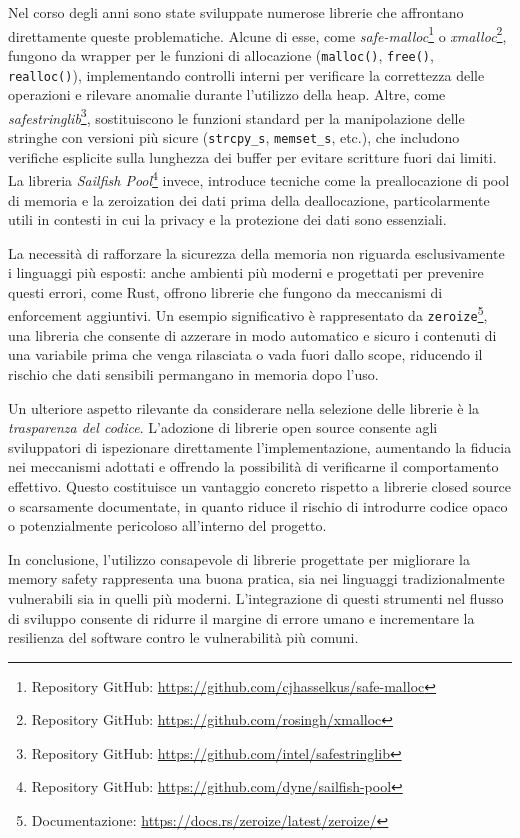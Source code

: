 Nel corso degli anni sono state sviluppate numerose librerie che affrontano direttamente
queste problematiche. Alcune di esse, come \textit{safe-malloc}\protect\footnote{Repository
GitHub: \url{https://github.com/cjhasselkus/safe-malloc}} o \textit{xmalloc}\protect\footnote{Repository
GitHub: \url{https://github.com/rosingh/xmalloc}}, fungono da wrapper per le
funzioni di allocazione (\texttt{malloc()}, \texttt{free()}, \texttt{realloc()}),
implementando controlli interni per verificare la correttezza delle operazioni e
rilevare anomalie durante l'utilizzo della heap. Altre, come \textit{safestringlib}\protect\footnote{Repository
GitHub: \url{https://github.com/intel/safestringlib}}, sostituiscono le funzioni
standard per la manipolazione delle stringhe con versioni più sicure (\texttt{strcpy\_s},
\texttt{memset\_s}, etc.), che includono verifiche esplicite sulla lunghezza dei
buffer per evitare scritture fuori dai limiti. La libreria \textit{Sailfish Pool}\protect\footnote{Repository
GitHub: \url{https://github.com/dyne/sailfish-pool}} invece, introduce tecniche come
la preallocazione di pool di memoria e la zeroization dei dati prima della deallocazione,
particolarmente utili in contesti in cui la privacy e la protezione dei dati
sono essenziali.

La necessità di rafforzare la sicurezza della memoria non riguarda
esclusivamente i linguaggi più esposti: anche ambienti più moderni e progettati per
prevenire questi errori, come Rust, offrono librerie che fungono da meccanismi di
enforcement aggiuntivi. Un esempio significativo è rappresentato da \texttt{zeroize}\protect\footnote{Documentazione:
\url{https://docs.rs/zeroize/latest/zeroize/}}, una libreria che consente di
azzerare in modo automatico e sicuro i contenuti di una variabile prima che
venga rilasciata o vada fuori dallo scope, riducendo il rischio che dati sensibili
permangano in memoria dopo l'uso.

Un ulteriore aspetto rilevante da considerare nella selezione delle librerie è la
\textit{trasparenza del codice}. L'adozione di librerie open source consente agli
sviluppatori di ispezionare direttamente l'implementazione, aumentando la
fiducia nei meccanismi adottati e offrendo la possibilità di verificarne il
comportamento effettivo. Questo costituisce un vantaggio concreto rispetto a librerie
closed source o scarsamente documentate, in quanto riduce il rischio di
introdurre codice opaco o potenzialmente pericoloso all'interno del progetto.

In conclusione, l'utilizzo consapevole di librerie progettate per migliorare la memory
safety rappresenta una buona pratica, sia nei linguaggi tradizionalmente
vulnerabili sia in quelli più moderni. L'integrazione di questi strumenti nel flusso
di sviluppo consente di ridurre il margine di errore umano e incrementare la resilienza
del software contro le vulnerabilità più comuni.

